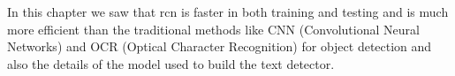 \vspace{0.75cm}
 In  this chapter we saw that \acrlong{rcn} is faster in both training and testing and is much more efficient than the traditional methods like CNN (Convolutional Neural Networks) and OCR (Optical Character Recognition) for object detection and also the details of the model used to build the text detector.
